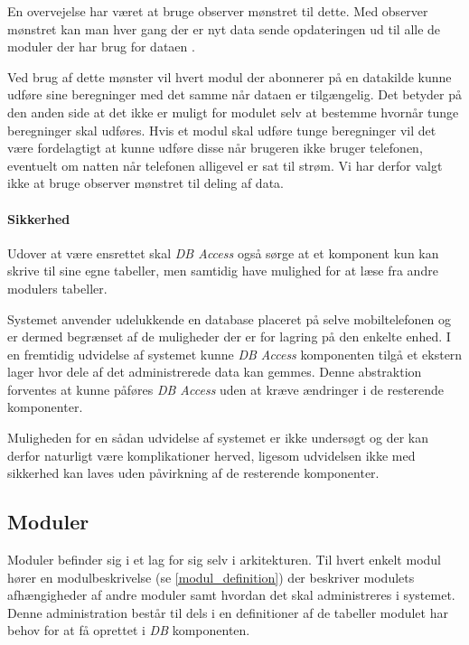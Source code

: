En overvejelse har været at bruge observer mønstret til dette.
Med observer mønstret kan man hver gang der er nyt data sende opdateringen ud til alle de moduler der har brug for dataen \cite[p.~244]{gamma1994design}.

Ved brug af dette mønster vil hvert modul der abonnerer på en datakilde kunne udføre sine beregninger med det samme når dataen er tilgængelig.
Det betyder på den anden side at det ikke er muligt for modulet selv at bestemme hvornår tunge beregninger skal udføres.
Hvis et modul skal udføre tunge beregninger vil det være fordelagtigt at kunne udføre disse når brugeren ikke bruger telefonen, eventuelt om natten når telefonen alligevel er sat til strøm.
Vi har derfor valgt ikke at bruge observer mønstret til deling af data.

\paragraph{Sikkerhed}
Udover at være ensrettet skal \textit{DB Access} også sørge at et komponent kun kan skrive til sine egne tabeller, men samtidig have mulighed for at læse fra andre modulers tabeller.


Systemet anvender udelukkende en database placeret på selve mobiltelefonen og er dermed begrænset af de muligheder der er for lagring på den enkelte enhed.
I en fremtidig udvidelse af systemet kunne \textit{DB Access} komponenten tilgå et ekstern lager hvor dele af det administrerede data kan gemmes.
Denne abstraktion forventes at kunne påføres \textit{DB Access} uden at kræve ændringer i de resterende komponenter.

Muligheden for en sådan udvidelse af systemet er ikke undersøgt og der kan derfor naturligt være komplikationer herved, ligesom udvidelsen ikke med sikkerhed kan laves uden påvirkning af de resterende komponenter.

\subsection*{Moduler}
Moduler befinder sig i et lag for sig selv i arkitekturen.
Til hvert enkelt modul hører en modulbeskrivelse (se \cref{modul_definition}) der beskriver modulets afhængigheder af andre moduler samt hvordan det skal administreres i systemet.
Denne administration består til dels i en definitioner af de tabeller modulet har behov for at få oprettet i \textit{DB} komponenten.


